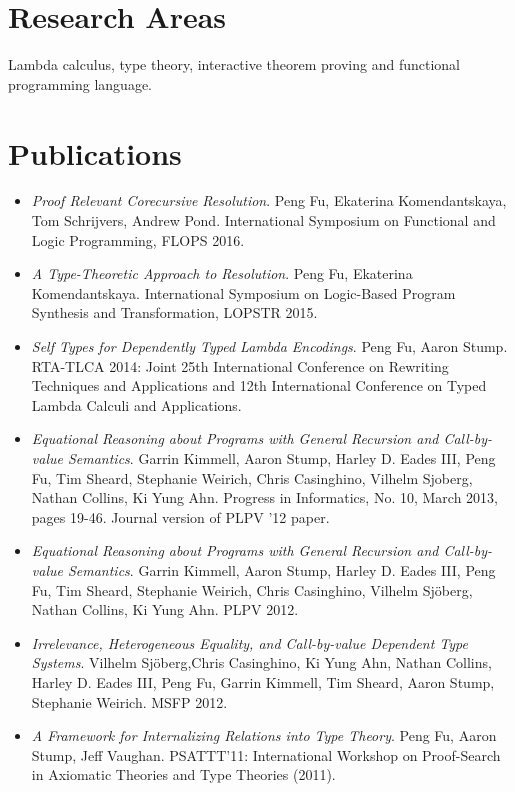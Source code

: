 \documentclass[11pt]{article}
\begin{document}
\section*{Research Areas}
Lambda calculus, type theory, interactive theorem proving and functional programming language.
\section*{Publications}

\begin{itemize}
\item \textit{Proof Relevant Corecursive Resolution}. Peng Fu, Ekaterina Komendantskaya, Tom Schrijvers, Andrew Pond. International Symposium on Functional and Logic Programming, FLOPS 2016.
\item \textit{A Type-Theoretic Approach to Resolution}. Peng Fu, Ekaterina Komendantskaya. International Symposium on Logic-Based Program Synthesis and Transformation, LOPSTR 2015.
  \item \textit{Self Types for Dependently Typed Lambda Encodings}. Peng Fu, Aaron Stump. RTA-TLCA 2014: Joint 25th International Conference on Rewriting Techniques and Applications and 12th International Conference on Typed Lambda Calculi and Applications. 
  \item \textit{Equational Reasoning about Programs with General Recursion and Call-by-value Semantics}. Garrin Kimmell, Aaron Stump, Harley D. Eades III, Peng Fu, Tim Sheard, Stephanie Weirich, Chris Casinghino, Vilhelm Sjoberg, Nathan Collins, Ki Yung Ahn. Progress in Informatics, No. 10, March 2013, pages 19-46. Journal version of PLPV '12 paper. 
\item \textit{Equational Reasoning about Programs with General Recursion and Call-by-value Semantics}. Garrin Kimmell, Aaron Stump, Harley D. Eades III, Peng Fu, Tim Sheard, Stephanie Weirich, Chris Casinghino, Vilhelm Sj\"oberg, Nathan Collins, Ki Yung Ahn. PLPV 2012. 
\item \textit{Irrelevance, Heterogeneous Equality, and Call-by-value Dependent Type Systems}. Vilhelm Sj\"oberg,Chris Casinghino, Ki Yung Ahn, Nathan Collins, Harley D. Eades III, Peng Fu, Garrin Kimmell, Tim Sheard, Aaron Stump, Stephanie Weirich. MSFP 2012.
\item \textit{A Framework for Internalizing Relations into Type Theory}. Peng Fu, Aaron Stump, Jeff Vaughan. PSATTT'11: International Workshop on Proof-Search in Axiomatic Theories and Type Theories (2011).
\end{itemize}
\end{document}
